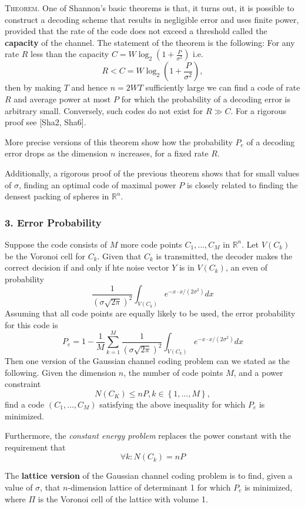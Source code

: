\documentclass{article}
\newcommand{\R}{\mathbb{R}}
\newcommand{\ass}[1]{\left( #1 \right)}
\newcommand{\set}[1]{\left\{ #1 \right\}}
\newcommand{\header}[1]{\vspace{1em}\noindent\textsc{#1.} }
\begin{document}
\header{Theorem}
One of Shannon's basic theorems is that, it turns out, it is possible to construct a decoding scheme that results in negligible error and uses finite power, provided that the rate of the code does not exceed a threshold called the \textbf{capacity} of the channel.
The statement of the theorem is the following:
For any rate $R$ less than the capacity $C = W \log_2 \ass{1 + \frac{P}{\sigma^2}}$ i.e.
$$ R < C = W \log_2 \ass{1 + \frac{P}{\sigma^2}}, $$
then by making $T$ and hence $n = 2WT$ sufficiently large we can find a code of rate $R$ and average power at most $P$ for which the probability of a decoding error is arbitrary small.
Conversely, such codes do not exist for $R \gg C$.
For a rigorous proof see [Sha2, Sha6].

More precise versions of this theorem show how the probability $P_e$ of a decoding error drops as the dimension $n$ increases, for a fixed rate $R$.

Additionally, a rigorous proof of the previous theorem shows that for small values of $\sigma$, finding an optimal code of maximal power $P$ is closely related to finding the densest packing of spheres in $\R^n$.

\subsubsection*{3. Error Probability}

Suppose the code consists of $M$ more code points $C_1, \dots, C_M$ in $\R^n$.
Let $V(C_k)$ be the Voronoi cell for $C_k$.
Given that $C_k$ is transmitted, the decoder makes the correct decision if and only if hte noise vector $Y$ is in $V(C_k)$, an even of probability
$$ \frac{1}{(\sigma \sqrt{2\pi})^2} \int_{V(C_k)} e^{-x \cdot x/(2\sigma^2)} dx $$
Assuming that all code points are equally likely to be used, the error probability for this code is
$$ P_e = 1 - \frac{1}{M} \sum_{k=1}^M \frac{1}{(\sigma \sqrt{2\pi})^2} \int_{V(C_k)} e^{-x \cdot x/(2\sigma^2)} dx $$
Then one version of the Gaussian channel coding problem can we stated as the following.
Given the dimension $n$, the number of code points $M$, and a power constraint
$$ N(C_K) \leq nP, k \in \set{1, \dots, M}, $$
find a code $(C_1, \dots, C_M)$ satisfying the above inequality for which $P_e$ is minimized.

Furthermore, the \textit{constant energy problem} replaces the power constant with the requirement that
$$ \forall k: N(C_k) = nP $$

The \textbf{lattice version} of the Gaussian channel coding problem is to find, given a value of $\sigma$, that $n$-dimension lattice of determinant 1 for which $P_e$ is minimized, where $\Pi$ is the Voronoi cell of the lattice with volume 1.
\end{document}
